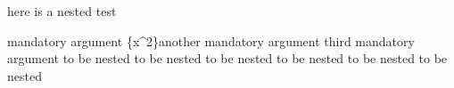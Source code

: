 here is a nested test
\begin{one}{%
		mandatory argument}{%
		\{x^2\}another mandatory argument}{%
		third mandatory argument}
	to be nested to be nested
	to be nested to be nested
	to be nested to be nested
\end{one}
